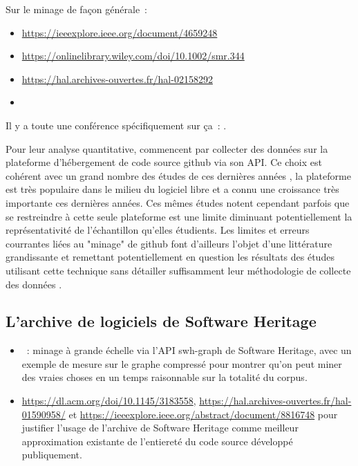 Sur le minage de façon générale :

\begin{itemize}
    \item \url{https://ieeexplore.ieee.org/document/4659248}
    \item \url{https://onlinelibrary.wiley.com/doi/10.1002/smr.344}
    \item \url{https://hal.archives-ouvertes.fr/hal-02158292}
    \item {}
\end{itemize}

Il y a toute une conférence spécifiquement sur ça : .

Pour leur analyse quantitative, \textcite{signals-2019} commencent par collecter des données sur la plateforme
d'hébergement de code source \gls{github} via son \gls{API}. Ce choix est cohérent avec un grand nombre des
études de ces dernières années , la plateforme est très populaire dans le
milieu du logiciel libre et a connu une croissance très importante ces dernières années. Ces mêmes études
notent cependant parfois que se restreindre à cette seule plateforme est une limite diminuant potentiellement
la représentativité de l'échantillon qu'elles étudients. Les limites et erreurs courrantes liées au "minage"
de \gls{github} font d'ailleurs l'objet d'une littérature grandissante et remettant potentiellement en
question les résultats des études utilisant cette technique sans détailler suffisamment leur méthodologie de
collecte des données \parencites{mining-github-2014}{penumbra-oss-2022}.

\subsection{L'archive de logiciels de Software Heritage}


\begin{itemize}
    \item {} : minage à grande échelle via l'API swh-graph de Software Heritage,
        avec un exemple de mesure sur le graphe compressé pour montrer qu'on peut miner des vraies choses en
        un temps raisonnable sur la totalité du corpus.
    \item \url{https://dl.acm.org/doi/10.1145/3183558}, \url{https://hal.archives-ouvertes.fr/hal-01590958/}
        et \url{https://ieeexplore.ieee.org/abstract/document/8816748} pour justifier l'usage de l'archive de
        Software Heritage comme meilleur approximation existante de l'entiereté du code source développé
        publiquement.
\end{itemize}

